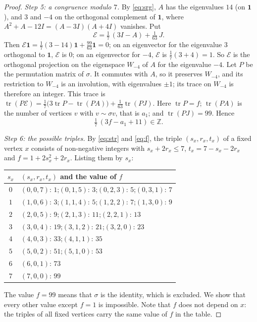 \documentclass[11pt,a4paper]{article}
\theoremstyle{definition}
\theoremstyle{remark}
\newcommand{\ZZ}{\mathbb{Z}}
\newcommand{\one}{\mathbf{1}}
\newcommand{\sg}{\sigma}
\newcommand{\tr}{\operatorname{tr}}
\begin{document}
\begin{proof}
\medskip\noindent\emph{Step 5: a congruence modulo $7$.}
By \eqref{eq:srg}, $A$ has the eigenvalues $14$ (on $\one$), and $3$ and $-4$ on the orthogonal complement of $\one$,
where $A^2+A-12I=(A-3I)(A+4I)$ vanishes. Put
\[
\mathcal E=\tfrac17\,(3I-A)+\tfrac1{63}\,J .
\]
Then $\mathcal E\one=\frac17(3-14)\one+\frac{99}{63}\one=0$; on an eigenvector for the eigenvalue $3$ orthogonal to
$\one$, $\mathcal E$ is $0$; on an eigenvector for $-4$, $\mathcal E$ is $\frac17(3+4)=1$. So $\mathcal E$ is the
orthogonal projection on the eigenspace $W_{-4}$ of $A$ for the eigenvalue $-4$. Let $P$ be the permutation matrix
of $\sg$. It commutes with $A$, so it preserves $W_{-4}$, and its restriction to $W_{-4}$ is an involution, with
eigenvalues $\pm1$; its trace on $W_{-4}$ is therefore an integer. This trace is
$\tr(P\mathcal E)=\frac17\bigl(3\tr P-\tr(PA)\bigr)+\frac1{63}\tr(PJ)$. Here $\tr P=f$; $\tr(PA)$ is the number of
vertices $v$ with $v\sim\sg v$, that is $a_1$; and $\tr(PJ)=99$. Hence
\begin{equation}\label{eq:trace}
\tfrac17\,(3f-a_1+11)\in\ZZ .
\end{equation}

\medskip\noindent\emph{Step 6: the possible triples.}
By \eqref{eq:str} and \eqref{eq:f}, the triple $(s_x,r_x,t_x)$ of a fixed vertex $x$ consists of non-negative
integers with $s_x+2r_x\le7$, $t_x=7-s_x-2r_x$ and $f=1+2s_x^2+2r_x$. Listing them by $s_x$:
\begin{center}
\begin{tabular}{c|l}
$s_x$ & $(s_x,r_x,t_x)$ and the value of $f$\\\hline
$0$ & $(0,0,7)$: $1$;\quad $(0,1,5)$: $3$;\quad $(0,2,3)$: $5$;\quad $(0,3,1)$: $7$\\
$1$ & $(1,0,6)$: $3$;\quad $(1,1,4)$: $5$;\quad $(1,2,2)$: $7$;\quad $(1,3,0)$: $9$\\
$2$ & $(2,0,5)$: $9$;\quad $(2,1,3)$: $11$;\quad $(2,2,1)$: $13$\\
$3$ & $(3,0,4)$: $19$;\quad $(3,1,2)$: $21$;\quad $(3,2,0)$: $23$\\
$4$ & $(4,0,3)$: $33$;\quad $(4,1,1)$: $35$\\
$5$ & $(5,0,2)$: $51$;\quad $(5,1,0)$: $53$\\
$6$ & $(6,0,1)$: $73$\\
$7$ & $(7,0,0)$: $99$
\end{tabular}
\end{center}
The value $f=99$ means that $\sg$ is the identity, which is excluded. We show that every other value except $f=1$
is impossible. Note that $f$ does not depend on $x$: the triples of all fixed vertices carry the same value of $f$
in the table.


\end{proof}
\end{document}
